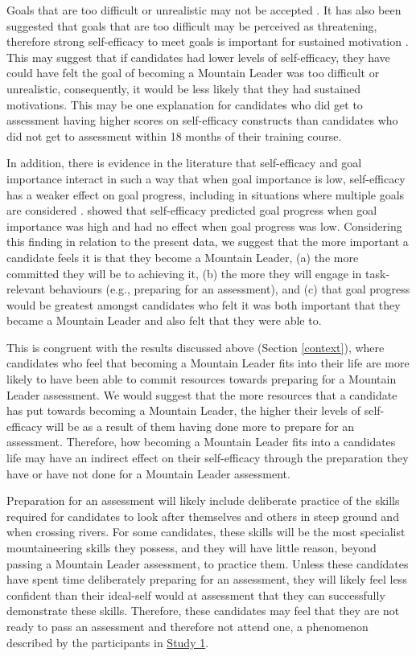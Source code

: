 \documentclass[
  12pt,
  a4paper,
]{book}
\begin{document}
Goals that are too difficult or unrealistic may not be accepted \citep{Kyllo1995}. It has also been suggested that goals that are too difficult may be perceived as threatening, therefore strong self-efficacy to meet goals is important for sustained motivation \citep{Bueno2008}. This may suggest that if candidates had lower levels of self-efficacy, they have could have felt the goal of becoming a Mountain Leader was too difficult or unrealistic, consequently, it would be less likely that they had sustained motivations. This may be one explanation for candidates who did get to assessment having higher scores on self-efficacy constructs than candidates who did not get to assessment within 18 months of their training course.

In addition, there is evidence in the literature that self-efficacy and goal importance interact in such a way that when goal importance is low, self-efficacy has a weaker effect on goal progress, including in situations where multiple goals are considered \citep[e.g.,][]{Beattie2015, Kernan1990, Orbell2001, Schmidt2007, Schmidt2009, Schmidt2009a}. \citet{Beattie2015} showed that self-efficacy predicted goal progress when goal importance was high and had no effect when goal progress was low. Considering this finding in relation to the present data, we suggest that the more important a candidate feels it is that they become a Mountain Leader, (a) the more committed they will be to achieving it, (b) the more they will engage in task-relevant behaviours (e.g., preparing for an assessment), and (c) that goal progress would be greatest amongst candidates who felt it was both important that they became a Mountain Leader and also felt that they were able to.

This is congruent with the results discussed above (Section \ref{context}), where candidates who feel that becoming a Mountain Leader fits into their life are more likely to have been able to commit resources towards preparing for a Mountain Leader assessment. We would suggest that the more resources that a candidate has put towards becoming a Mountain Leader, the higher their levels of self-efficacy will be as a result of them having done more to prepare for an assessment. Therefore, how becoming a Mountain Leader fits into a candidates life may have an indirect effect on their self-efficacy through the preparation they have or have not done for a Mountain Leader assessment.

Preparation for an assessment will likely include deliberate practice of the skills required for candidates to look after themselves and others in steep ground and when crossing rivers. For some candidates, these skills will be the most specialist mountaineering skills they possess, and they will have little reason, beyond passing a Mountain Leader assessment, to practice them. Unless these candidates have spent time deliberately preparing for an assessment, they will likely feel less confident than their ideal-self would at assessment that they can successfully demonstrate these skills. Therefore, these candidates may feel that they are not ready to pass an assessment and therefore not attend one, a phenomenon described by the participants in \protect\hyperlink{ml-qualitative}{Study 1}.
\end{document}

